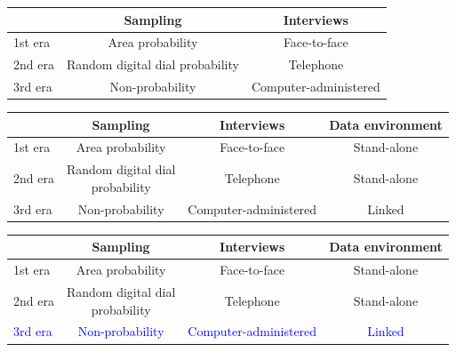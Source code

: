 \documentclass[aspectratio=169]{beamer}
\begin{document}
\begin{frame}

\begin{center}
\begin{tabular}{ l c c}
           & Sampling& Interviews \\
\hline
1st era & Area probability & Face-to-face \\
\pause
2nd era & Random digital dial probability & Telephone \\
\pause
3rd era & \pause Non-probability & Computer-administered  \\
\end{tabular}
\end{center}

\end{frame}
\begin{frame}

\begin{center}
\small{
\begin{tabular}{ l c c c}
           & Sampling & Interviews & Data environment\\
\hline
1st era & Area probability & Face-to-face & Stand-alone \\
2nd era & \parbox[t]{3cm}{\centering Random digital dial\\probability} & Telephone & Stand-alone \\
3rd era & Non-probability & Computer-administered  & Linked \\
\end{tabular}
}
\end{center}

\end{frame}
\begin{frame}

\begin{center}
\small{
\begin{tabular}{ l c c c}
           & Sampling & Interviews & Data environment\\
\hline
1st era & Area probability & Face-to-face & Stand-alone \\
2nd era & \parbox[t]{3cm}{\centering Random digital dial\\probability} & Telephone & Stand-alone \\
\textcolor{blue}{3rd era} & \textcolor{blue}{Non-probability} & \textcolor{blue}{Computer-administered}  & \textcolor{blue}{Linked} \\
\end{tabular}
}
\end{center}

\end{frame}
\end{document}
